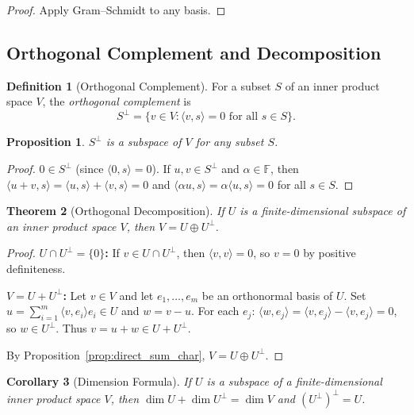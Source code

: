 \documentclass[11pt,a4paper]{article}
\theoremstyle{definition}
\newtheorem{definition}{Definition}[section]
\theoremstyle{plain}
\newtheorem{theorem}{Theorem}[section]
\newtheorem{proposition}[theorem]{Proposition}
\newtheorem{corollary}[theorem]{Corollary}
\theoremstyle{remark}
\newcommand{\F}{\mathbb{F}}
\begin{document}
\begin{proof}
Apply Gram--Schmidt to any basis.
\end{proof}

\subsection{Orthogonal Complement and Decomposition}
\label{subsec:orthogonal_complement}

\begin{definition}[Orthogonal Complement]
\label{def:orthogonal_complement}
For a subset $S$ of an inner product space $V$, the \emph{orthogonal complement} is
\[
    S^\perp = \{v \in V : \langle v, s \rangle = 0 \text{ for all } s \in S\}.
\]
\end{definition}

\begin{proposition}
\label{prop:orth_complement_subspace}
$S^\perp$ is a subspace of $V$ for any subset $S$.
\end{proposition}

\begin{proof}
$0 \in S^\perp$ (since $\langle 0, s \rangle = 0$). If $u, v \in S^\perp$ and $\alpha \in \F$,
then $\langle u + v, s \rangle = \langle u, s \rangle + \langle v, s \rangle = 0$ and
$\langle \alpha u, s \rangle = \alpha \langle u, s \rangle = 0$ for all $s \in S$.
\end{proof}

\begin{theorem}[Orthogonal Decomposition]
\label{thm:orthogonal_decomposition}
If $U$ is a finite-dimensional subspace of an inner product space $V$, then
$V = U \oplus U^\perp$.
\end{theorem}

\begin{proof}
\textbf{$U \cap U^\perp = \{0\}$:} If $v \in U \cap U^\perp$, then $\langle v, v \rangle = 0$,
so $v = 0$ by positive definiteness.

\textbf{$V = U + U^\perp$:} Let $v \in V$ and let $e_1, \ldots, e_m$ be an orthonormal basis
of $U$. Set $u = \sum_{i=1}^m \langle v, e_i \rangle e_i \in U$ and $w = v - u$. For each
$e_j$: $\langle w, e_j \rangle = \langle v, e_j \rangle - \langle v, e_j \rangle = 0$,
so $w \in U^\perp$. Thus $v = u + w \in U + U^\perp$.

By Proposition~\ref{prop:direct_sum_char}, $V = U \oplus U^\perp$.
\end{proof}

\begin{corollary}[Dimension Formula]
\label{cor:dim_complement}
If $U$ is a subspace of a finite-dimensional inner product space $V$, then
$\dim U + \dim U^\perp = \dim V$ and $(U^\perp)^\perp = U$.
\end{corollary}
\end{document}
